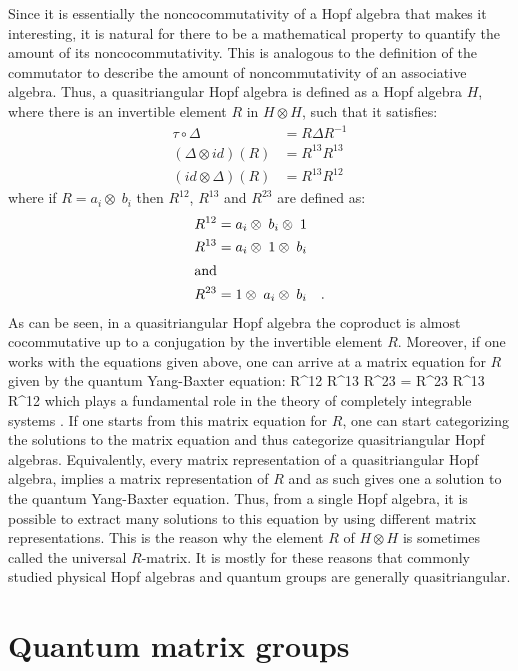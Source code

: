 Since it is essentially the noncocommutativity of a Hopf algebra that makes it interesting,
it is natural for there to be a mathematical property to quantify the amount of
its noncocommutativity. This is analogous to the definition of the commutator to describe
the amount of noncommutativity of an associative algebra. Thus, a quasitriangular Hopf
algebra is defined as a Hopf algebra $H$, where there is an invertible element $R$
in $H \otimes H$, such that it satisfies:
\begin{align}
\tau \circ \Delta & = R \Delta R^{-1} \\
(\Delta \otimes id)(R) & = R^{13} R^{13} \\
(id \otimes \Delta)(R) & = R^{13} R^{12}
\end{align}
where if $R = a_{i} \otimes\; b_{i}$ then $R^{12}$, $R^{13}$ and $R^{23}$ are defined as:
\begin{align}
R^{12} & = a_{i} \otimes\; b_{i} \otimes\; 1 \\
R^{13} & = a_{i} \otimes\; 1 \otimes\; b_{i} \\
\intertext{and}
R^{23} & = 1 \otimes\; a_{i} \otimes\; b_{i} \quad .
\end{align}
As can be seen, in a quasitriangular Hopf algebra the coproduct is almost cocommutative
up to a conjugation by the invertible element $R$. Moreover, if one works with
the equations given above, one can arrive at a matrix equation for $R$
given by the quantum Yang-Baxter equation:
\beq
R^{12} R^{13} R^{23} = R^{23} R^{13} R^{12}
\eeq
which plays a fundamental role in the theory of completely integrable systems \cite{qybe}.
If one starts from this matrix equation for $R$, one can start categorizing the solutions
to the matrix equation and thus categorize quasitriangular Hopf algebras. Equivalently,
every matrix representation of a quasitriangular Hopf algebra, implies a matrix representation
of $R$ and as such gives one a solution to the quantum Yang-Baxter equation. Thus, from
a single Hopf algebra, it is possible to extract many solutions to this equation by using
different matrix representations. This is the reason why the element $R$ of $H \otimes H$ is
sometimes called the universal $R$-matrix. It is mostly for these reasons that commonly
studied physical Hopf algebras and quantum groups are generally quasitriangular.

\section{Quantum matrix groups}


